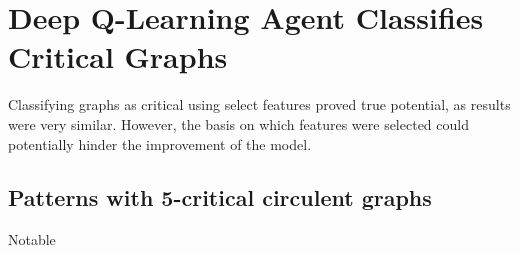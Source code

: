 \documentclass[12pt, letterpaper, twoside]{article}
\begin{document}
\section{Deep Q-Learning Agent Classifies Critical Graphs}
Classifying graphs as critical using select features proved true potential, as results were very similar. However, the basis on which features were selected could potentially hinder the improvement of the model. 





\subsection{Patterns with 5-critical circulent graphs}
Notable 
\end{document}

